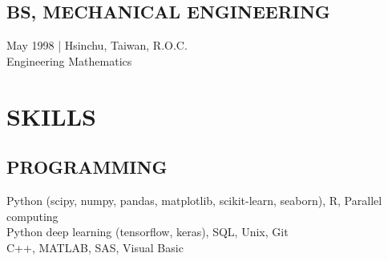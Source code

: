 \documentclass[]{hieudo-build}
\begin{document}
\begin{minipage}[t]{0.34\textwidth}
\subsection{BS, MECHANICAL ENGINEERING}
{\color{gray} May 1998 | Hsinchu, Taiwan, R.O.C.} \\
Engineering Mathematics \\


\section{SKILLS}
\subsection{PROGRAMMING}
Python (scipy, numpy, pandas, matplotlib, scikit-learn, seaborn), R, Parallel computing \\

\vspace{0.08in}
Python deep learning (tensorflow, keras), SQL, Unix, Git \\

\vspace{0.08in}
C++, MATLAB, SAS, Visual Basic \\

%
%
\end{minipage} 
\hfill
\end{document}
